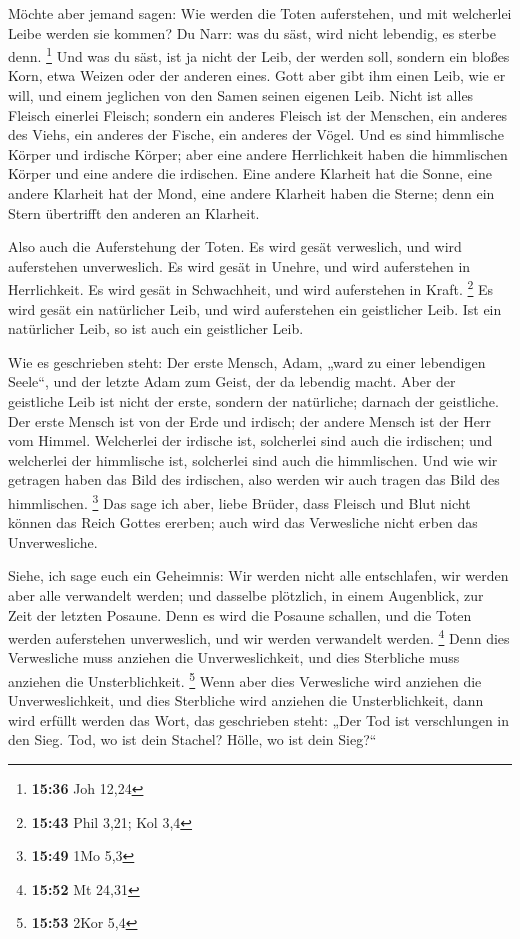  Möchte aber jemand sagen: Wie werden die Toten
auferstehen, und mit welcherlei Leibe werden sie kommen? 
Du Narr: was du säst, wird nicht lebendig, es sterbe denn. \footnote{\textbf{15:36}
  Joh 12,24}  Und was du säst, ist ja nicht der Leib, der
werden soll, sondern ein bloßes Korn, etwa Weizen oder der anderen
eines.  Gott aber gibt ihm einen Leib, wie er will, und
einem jeglichen von den Samen seinen eigenen Leib.  Nicht
ist alles Fleisch einerlei Fleisch; sondern ein anderes Fleisch ist der
Menschen, ein anderes des Viehs, ein anderes der Fische, ein anderes der
Vögel.  Und es sind himmlische Körper und irdische Körper;
aber eine andere Herrlichkeit haben die himmlischen Körper und eine
andere die irdischen.  Eine andere Klarheit hat die Sonne,
eine andere Klarheit hat der Mond, eine andere Klarheit haben die
Sterne; denn ein Stern übertrifft den anderen an Klarheit.

 Also auch die Auferstehung der Toten. Es wird gesät
verweslich, und wird auferstehen unverweslich.  Es wird
gesät in Unehre, und wird auferstehen in Herrlichkeit. Es wird gesät in
Schwachheit, und wird auferstehen in Kraft. \footnote{\textbf{15:43}
  Phil 3,21; Kol 3,4}  Es wird gesät ein natürlicher Leib,
und wird auferstehen ein geistlicher Leib. Ist ein natürlicher Leib, so
ist auch ein geistlicher Leib.

 Wie es geschrieben steht: Der erste Mensch, Adam, „ward zu
einer lebendigen Seele``, und der letzte Adam zum Geist, der da lebendig
macht.  Aber der geistliche Leib ist nicht der erste,
sondern der natürliche; darnach der geistliche.  Der erste
Mensch ist von der Erde und irdisch; der andere Mensch ist der Herr vom
Himmel.  Welcherlei der irdische ist, solcherlei sind auch
die irdischen; und welcherlei der himmlische ist, solcherlei sind auch
die himmlischen.  Und wie wir getragen haben das Bild des
irdischen, also werden wir auch tragen das Bild des himmlischen.
\footnote{\textbf{15:49} 1Mo 5,3}  Das sage ich aber, liebe
Brüder, dass Fleisch und Blut nicht können das Reich Gottes ererben;
auch wird das Verwesliche nicht erben das Unverwesliche.

 Siehe, ich sage euch ein Geheimnis: Wir werden nicht alle
entschlafen, wir werden aber alle verwandelt werden;  und
dasselbe plötzlich, in einem Augenblick, zur Zeit der letzten Posaune.
Denn es wird die Posaune schallen, und die Toten werden auferstehen
unverweslich, und wir werden verwandelt werden. \footnote{\textbf{15:52}
  Mt 24,31}  Denn dies Verwesliche muss anziehen die
Unverweslichkeit, und dies Sterbliche muss anziehen die Unsterblichkeit.
\footnote{\textbf{15:53} 2Kor 5,4}  Wenn aber dies
Verwesliche wird anziehen die Unverweslichkeit, und dies Sterbliche wird
anziehen die Unsterblichkeit, dann wird erfüllt werden das Wort, das
geschrieben steht:  „Der Tod ist verschlungen in den Sieg.
Tod, wo ist dein Stachel? Hölle, wo ist dein Sieg?{}``

